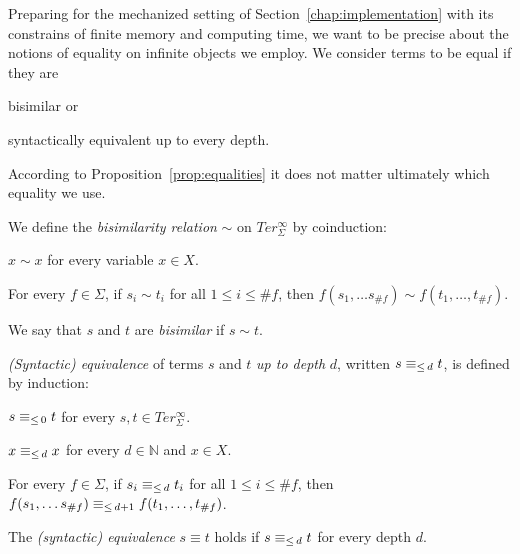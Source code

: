
Preparing for the mechanized setting of Section~\ref{chap:implementation} with
its constrains of finite memory and computing time, we want to be precise
about the notions of equality on infinite objects we employ. We consider terms
to be equal if they are
\begin{inparaenum}[(i)]
  \item bisimilar or
  \item syntactically equivalent up to every depth.
\end{inparaenum} According to Proposition~\ref{prop:equalities} it does not
matter ultimately which equality we use.

\begin{definition}\label{def:bisimilarity}%
We define the \emph{bisimilarity relation} $\sim$ on $Ter_\Sigma^\infty$ by
coinduction:
\begin{compactenum}
  \item
    $x \sim x$ for every variable $x \in X$.
  \item
    For every $f \in \Sigma$, if $s_i \sim t_i$ for all $1 \leq i \leq \#f$,
    then $f(s_1, \ldots s_{\#f}) \sim f(t_1, \ldots, t_{\#f})$.
\end{compactenum}
We say that $s$ and $t$ are \emph{bisimilar} if $s \sim t$.
\end{definition}

\begin{definition}\label{def:equiv}%
\emph{(Syntactic) equivalence} of terms $s$ and $t$ \emph{up to depth} $d$,
written $s \equiv_{\le \, d} t$, is defined by induction:
\begin{compactenum}
  \item $s \equiv_{\le \, 0} t$ for every $s, t \in Ter_\Sigma^\infty$.
  \item $x \equiv_{\le \, d} x$ for every $d \in \mathbb{N}$ and $x \in X$.
  \item For every $f \in \Sigma$, if $s_i \equiv_{\le \, d} t_i$ for all $1 \leq i
    \leq \#f$, then $f(s_1, \ldots s_{\#f}) \equiv_{\le \, d+1} f(t_1, \ldots,
    t_{\#f})$.
\end{compactenum}
The \emph{(syntactic) equivalence} $s \equiv t$ holds if $s \equiv_{\le \, d} t$ for
every depth $d$.
\end{definition}

